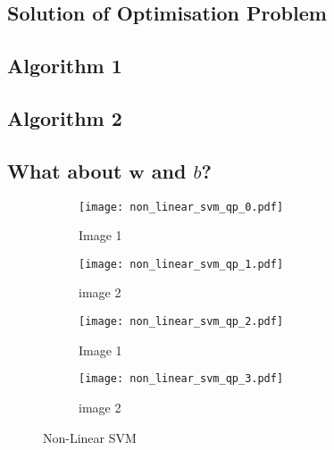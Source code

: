 \documentclass[10pt, a4paper,reqno]{amsart}
\begin{document}
\subsection{Solution of Optimisation Problem}


\subsection{Algorithm 1}


\subsection{Algorithm 2}


\subsection{What about $\mathbf{w}$ and $b$?}


\begin{figure}[H]
	\centering	
	\begin{subfigure}{0.5\textwidth}
		\centering
		\texttt{[image: non\_linear\_svm\_qp\_0.pdf]}
		\caption{Image 1}
	\end{subfigure}%
	\begin{subfigure}{0.5\textwidth}
		\centering
		\texttt{[image: non\_linear\_svm\_qp\_1.pdf]}
		\caption{image 2}
	\end{subfigure}
	\begin{subfigure}{0.5\textwidth}
		\centering
		\texttt{[image: non\_linear\_svm\_qp\_2.pdf]}
		\caption{Image 1}
	\end{subfigure}%
	\begin{subfigure}{0.5\textwidth}
		\centering
		\texttt{[image: non\_linear\_svm\_qp\_3.pdf]}
		\caption{image 2}
	\end{subfigure}
	\caption{Non-Linear SVM}
\end{figure}
\end{document}
